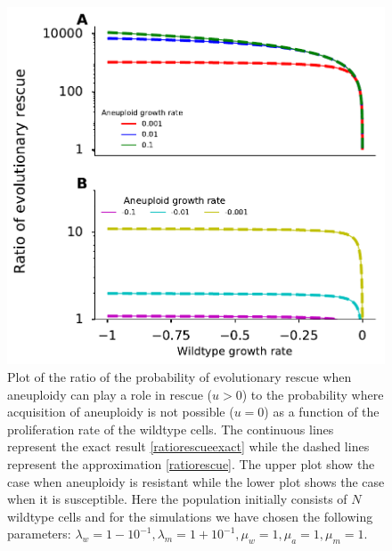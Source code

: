 \documentclass[12pt]{extarticle}
\begin{document}
\begin{figure}[!t]
 \vspace*{1\baselineskip}
\includegraphics[width=1\textwidth]{Figures/RatioEvolRescue.pdf}
\caption{Plot of the ratio of the probability of evolutionary rescue when aneuploidy can play a role in rescue ($u>0$) to the probability where acquisition of aneuploidy is not possible ($u=0$) as a function of the proliferation rate of the wildtype cells. The continuous lines represent the exact result \eqref{ratiorescueexact} while the dashed lines represent the approximation \eqref{ratiorescue}.  The upper plot show the case when aneuploidy is resistant while the lower plot shows the case when it is susceptible. Here the population initially consists of $N$ wildtype cells and for the simulations we have chosen the following parameters: $\lambda_w=1-10^{-1},\lambda_m=1+10^{-1},\mu_w=1,\mu_a=1,\mu_m=1$. }
\label{RatioEvolRescue}
\end{figure}
\end{document}
